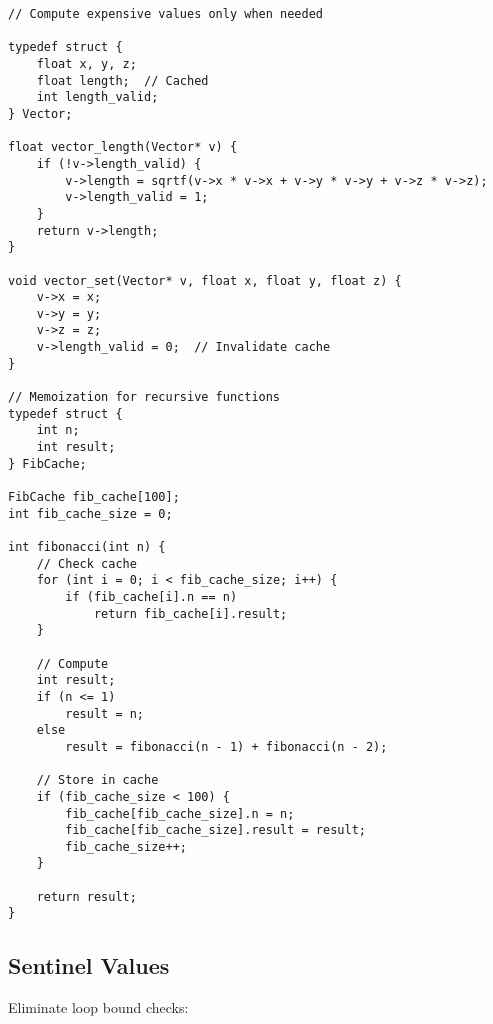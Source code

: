 \begin{lstlisting}
// Compute expensive values only when needed

typedef struct {
    float x, y, z;
    float length;  // Cached
    int length_valid;
} Vector;

float vector_length(Vector* v) {
    if (!v->length_valid) {
        v->length = sqrtf(v->x * v->x + v->y * v->y + v->z * v->z);
        v->length_valid = 1;
    }
    return v->length;
}

void vector_set(Vector* v, float x, float y, float z) {
    v->x = x;
    v->y = y;
    v->z = z;
    v->length_valid = 0;  // Invalidate cache
}

// Memoization for recursive functions
typedef struct {
    int n;
    int result;
} FibCache;

FibCache fib_cache[100];
int fib_cache_size = 0;

int fibonacci(int n) {
    // Check cache
    for (int i = 0; i < fib_cache_size; i++) {
        if (fib_cache[i].n == n)
            return fib_cache[i].result;
    }

    // Compute
    int result;
    if (n <= 1)
        result = n;
    else
        result = fibonacci(n - 1) + fibonacci(n - 2);

    // Store in cache
    if (fib_cache_size < 100) {
        fib_cache[fib_cache_size].n = n;
        fib_cache[fib_cache_size].result = result;
        fib_cache_size++;
    }

    return result;
}
\end{lstlisting}

\subsection{Sentinel Values}

Eliminate loop bound checks:

